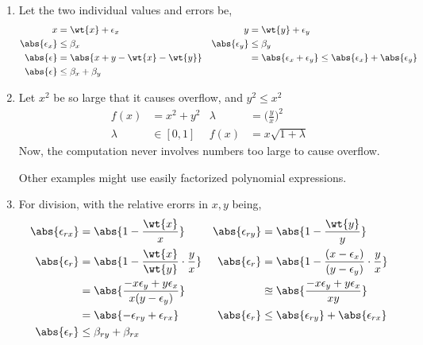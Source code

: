 \begin{enumerate}
    \item Let the two individual values and errors be,
          \begin{align}
              x                & = \wt{x} + \epsilon_x           &
              y                & = \wt{y} + \epsilon_y             \\
              \abs{\epsilon_x} & \leq \beta_x                    &
              \abs{\epsilon_y} & \leq \beta_y                      \\
              \abs{\epsilon}   & = \abs{x + y - \wt{x} - \wt{y}} &
                               & = \abs{\epsilon_x + \epsilon_y}
              \leq \abs{\epsilon_x} + \abs{\epsilon_y}             \\
              \abs{\epsilon}   & \leq \beta_x + \beta_y
          \end{align}

    \item Let $ x^2 $ be so large that it causes overflow, and $ y^2 \leq x^2 $
          \begin{align}
              f(x)    & = x^2 + y^2 & \lambda & = \Big(\frac{y}{x}\Big)^2 \\
              \lambda & \in [0,1]   & f(x)    & = x \sqrt{1 + \lambda}
          \end{align}
          Now, the computation never involves numbers too large to cause overflow.
          \par Other examples might use easily factorized polynomial expressions.

    \item For division, with the relative erorrs in $ x,y $ being,
          \begin{align}
              \abs{\epsilon_{rx}}  & = \abs{1 - \frac{\wt{x}}{x}}                   &
              \abs{\epsilon_{ry}}  & = \abs{1 - \frac{\wt{y}}{y}}                     \\
              \abs{\epsilon_r}     & = \abs{1 - \frac{\wt{x}}{\wt{y}}
              \cdot \frac{y}{x}}   &
              \abs{\epsilon_r}     & = \abs{1 - \frac{(x - \epsilon_x)}
              {(y - \epsilon_y)} \cdot \frac{y}{x}}                                   \\
                                   & = \abs{\frac{-x\epsilon_y + y\epsilon_x}
              {x(y - \epsilon_y)}} &
                                   & \approxeq \abs{\frac{-x\epsilon_y
              + y\epsilon_x}{xy}}                                                     \\
                                   & = \abs{-\epsilon_{ry} + \epsilon_{rx}}         &
              \abs{\epsilon_r}     & \leq \abs{\epsilon_{ry}} + \abs{\epsilon_{rx}}   \\
              \abs{\epsilon_r}     & \leq \beta_{ry} + \beta_{rx}
          \end{align}


\end{enumerate}
